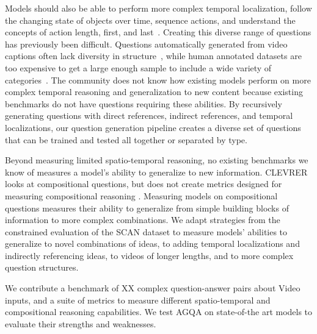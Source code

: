 Models should also be able to perform more complex temporal localization, follow the changing state of objects over time, sequence actions, and understand the concepts of action length, first, and last~\cite{lake2018generalization,vatashsky2020vqa}. Creating this diverse range of questions has previously been difficult. Questions automatically generated from video captions often lack diversity in structure~\cite{yu2019activitynet, jang2017tgif}, while human annotated datasets are too expensive to get a large enough sample to include a wide variety of categories~\cite{zeng2016leveraging, yu2019activitynet}. The community does not know how existing models perform on more complex temporal reasoning and generalization to new content because existing benchmarks do not have questions requiring these abilities. By recursively generating questions with direct references, indirect references, and temporal localizations, our question generation pipeline creates a diverse set of questions that can be trained and tested all together or separated by type.


Beyond measuring limited spatio-temporal reasoning, no existing benchmarks we know of measures a model's ability to generalize to new information. CLEVRER looks at compositional questions, but does not create metrics designed for measuring compositional reasoning \cite{yi2019clevrer}. Measuring models on compositional questions measures their ability to generalize from simple building blocks of information to more complex combinations. We adapt strategies from the constrained evaluation of the SCAN dataset \cite{lake2018generalization} to measure models' abilities to generalize to novel combinations of ideas, to adding temporal localizations and indirectly referencing ideas, to videos of longer lengths, and to more complex question structures.


We contribute a benchmark of XX complex question-answer pairs about Video inputs, and a suite of metrics to measure different spatio-temporal and compositional reasoning capabilities. We test AGQA on state-of-the art models to evaluate their strengths and weaknesses. 


